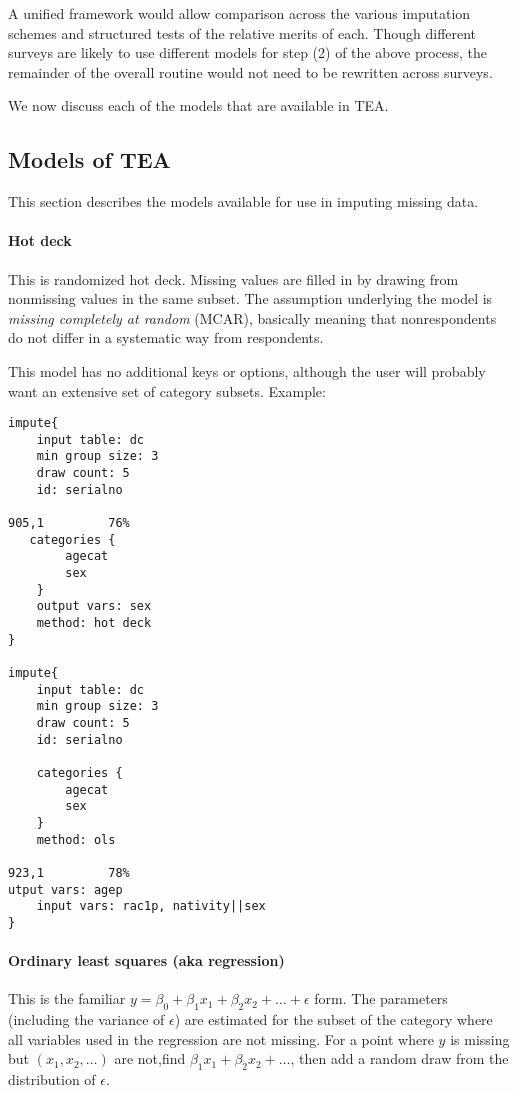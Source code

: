 \documentclass{article}
\begin{document}
A unified framework would allow comparison across the various imputation
schemes and structured tests of the relative merits of each. Though different surveys
are likely to use different models for step (2) of the above process, the
remainder of the overall routine would not need to be rewritten across surveys.

We now discuss each of the models that are available in TEA.

\subsection{Models of TEA} This section describes the models available for use in imputing
missing data.

\paragraph{Hot deck} This is randomized hot deck. Missing values are filled in by
drawing from nonmissing values in the same subset. The assumption underlying the model
is {\em missing completely at random} (MCAR), basically meaning that nonrespondents
do not differ in a systematic way from respondents.

This model has no additional keys or options, although the user will probably want an
extensive set of category subsets. Example:

\begin{lstlisting}
impute{
    input table: dc
    min group size: 3
    draw count: 5
    id: serialno
                                                                             905,1         76%
   categories {
        agecat
        sex
    }
    output vars: sex
    method: hot deck
}

impute{
    input table: dc
    min group size: 3
    draw count: 5
    id: serialno

    categories {
        agecat
        sex
    }
    method: ols
                                                                             923,1         78%
utput vars: agep
    input vars: rac1p, nativity||sex
}
\end{lstlisting}

\paragraph{Ordinary least squares (aka regression)}  This is the familiar $y = \beta_0
+ \beta_1 x_1  + \beta_2 x_2 + \dots +\epsilon$ form. The parameters (including the
variance of $\epsilon$) are estimated for the subset of the category where all variables
used in the regression are not missing. For a point where $y$ is missing but $(x_1, x_2, \dots)$ are not,find $\beta_1 x_1  + \beta_2 x_2 + \dots$, then add a random draw from the distribution of $\epsilon$.
\end{document}
